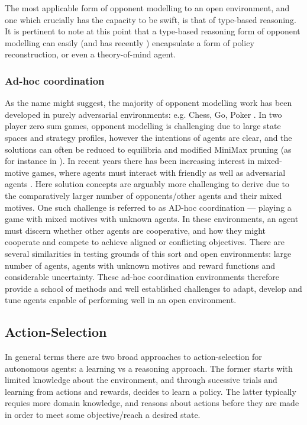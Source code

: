 \newline \newline
The most applicable form of opponent modelling to an open environment, and one which crucially has the capacity to be swift, is that of type-based reasoning. It is pertinent to note at this point that a type-based reasoning form of opponent modelling can easily (and has recently \cite{Albrecht__explioting_causality}) encapsulate a form of policy reconstruction, or even a theory-of-mind agent.
\subsubsection{Ad-hoc coordination}
As the name might suggest, the majority of opponent modelling work has been developed in purely adversarial environments: e.g. Chess, Go, Poker \cite{Brown2017,Brown2020,AlphaGo}. In two player zero sum games, opponent modelling is challenging due to large state spaces and strategy profiles, however the intentions of agents are clear, and the solutions can often be reduced to equilibria and modified MiniMax pruning (as for instance in \cite{Brown2020}). 
\newline \newline
In recent years there has been increasing interest in mixed-motive games, where agents must interact with friendly as well as adversarial agents \cite{Barrett2017}. Here solution concepts are arguably more challenging to derive due to the comparatively larger number of opponents/other agents and their mixed motives. One such challenge is referred to as AD-hoc coordination --- playing a game with mixed motives with unknown agents. In these environments, an agent must discern whether other agents are cooperative, and how they might cooperate and compete to achieve aligned or conflicting objectives.
\newline \newline
There are several similarities in testing grounds of this sort and open environments: large number of agents, agents with unknown motives and reward functions and considerable uncertainty. These ad-hoc coordination environments therefore provide a school of methods and well established challenges to adapt, develop and tune agents capable of performing well in an open environment. 

\subsection{Action-Selection}
In general terms there are two broad approaches to action-selection for autonomous agents: a learning vs a reasoning approach. The former starts with limited knowledge about the environment, and through sucessive trials and learning from actions and rewards, decides to learn a policy. The latter typically requies more domain knowledge, and reasons about actions before they are made in order to meet some objective/reach a desired state. 
